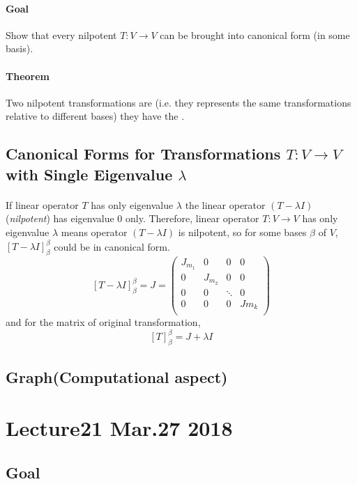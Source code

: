 \documentclass[11pt]{article}
\newcommand{\trans}[3]{{#1}: {#2} \to {#3}}
\newcommand{\tmat}[3]{[{#1}]_{{#2}}^{{#3}}}
\newcommand{\theorem}[0]{\paragraph{Theorem}}
\begin{document}
	\paragraph{Goal} Show that every nilpotent $\trans{T}{V}{V}$ can be brought into canonical form (in some basis).
	
	\theorem Two nilpotent transformations are  (i.e. they represents the same transformations relative to different bases)  they have the .
	
	\subsection{Canonical Forms for Transformations $\trans{T}{V}{V}$ with Single Eigenvalue $\lambda$}
	\paragraph{} If linear operator $T$ has only eigenvalue $\lambda$ the linear operator $(T - \lambda I)$(\emph{nilpotent}) has eigenvalue $0$ only. Therefore, linear operator $\trans{T}{V}{V}$ has only eigenvalue $\lambda$ means operator $(T - \lambda I)$ is nilpotent, so for some bases $\beta$ of $V$, $\tmat{T-\lambda I}{\beta}{\beta}$ could be in canonical form.
	\[
		\tmat{T - \lambda I}{\beta}{\beta} = J = \begin{pmatrix}
			J_{m_1} & 0 & 0 & 0 \\
			0 & J_{m_2} & 0 & 0\\
			0 & 0 & \ddots & 0 \\
			0 & 0 & 0 & J{m_k} \\
		\end{pmatrix}
	\]
	and for the matrix of original transformation, 
	\[
		\tmat{T}{\beta}{\beta} = J + \lambda I
	\]
	
	\subsection{Graph(Computational aspect)}
	\paragraph{}
	
	\section{Lecture21 Mar.27 2018}
	\subsection{Goal} 
\end{document}
